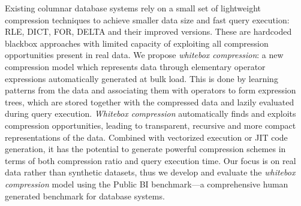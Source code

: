 


\begin{abstracts}        %

Existing columnar database systems rely on a small set of lightweight compression techniques to achieve smaller data size and fast query execution: RLE, DICT, FOR, DELTA and their improved versions. These are hardcoded blackbox approaches with limited capacity of exploiting all compression opportunities present in real data. We propose \textit{whitebox compression}: a new compression model which represents data through elementary operator expressions automatically generated at bulk load. This is done by learning patterns from the data and associating them with operators to form expression trees, which are stored together with the compressed data and lazily evaluated during query execution. \textit{Whitebox compression} automatically finds and exploits compression opportunities, leading to transparent, recursive and more compact representations of the data. Combined with vectorized execution or JIT code generation, it has the potential to generate powerful compression schemes in terms of both compression ratio and query execution time. Our focus is on real data rather than synthetic datasets, thus we develop and evaluate the \textit{whitebox compression} model using the Public BI benchmark---a comprehensive human generated benchmark for database systems.
\end{abstracts}


